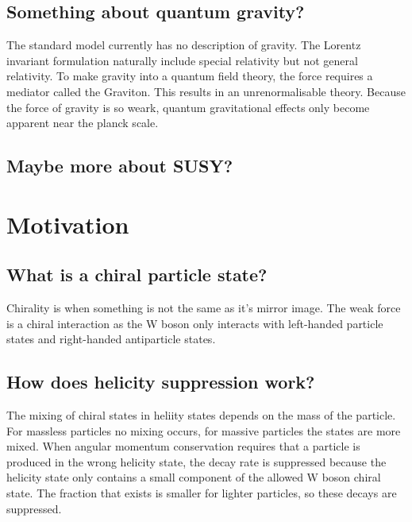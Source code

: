 \documentclass[12pt]{article}
\begin{document}
\subsection{Something about quantum gravity?}
The standard model currently has no description of gravity. The Lorentz invariant formulation naturally include special relativity but not general relativity. To make gravity into a quantum field theory, the force requires a mediator called the Graviton. This results in an unrenormalisable theory. Because the force of gravity is so weark, quantum gravitational effects only become apparent near the planck scale. 


\subsection{Maybe more about SUSY?}

\section{Motivation}
\subsection{What is a chiral particle state?}
Chirality is when something is not the same as it's mirror image. The weak force is a chiral interaction as the W boson only interacts with left-handed particle states and right-handed antiparticle states.  

\subsection{How does helicity suppression work?}
The mixing of chiral states in heliity states depends on the mass of the particle. For massless particles no mixing occurs, for massive particles the states are more mixed. When angular momentum conservation requires that a particle is produced in the wrong helicity state, the decay rate is suppressed because the helicity state only contains a small component of the allowed W boson chiral state. The fraction that exists is smaller for lighter particles, so these decays are suppressed.
\end{document}
